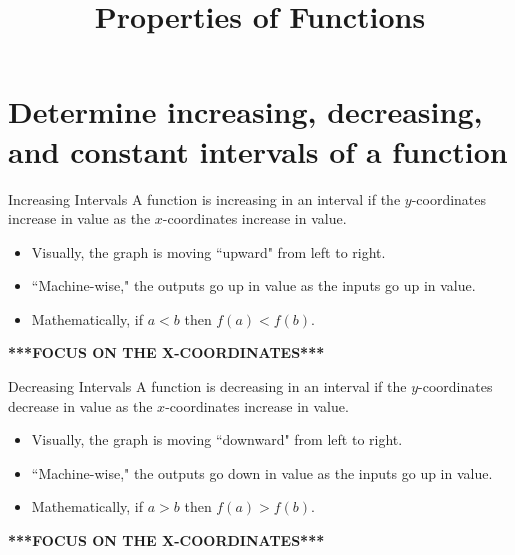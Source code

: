 \documentclass[t,usenames,dvipsnames]{beamer}
\title{Properties of Functions}
\author{}
\date{}
\begin{document}
\begin{frame}
    \titlepage
\end{frame}


\section{Determine increasing, decreasing, and constant intervals of a function}

\begin{frame}{Increasing Intervals}
A function is \alert{increasing} in an interval if the $y$-coordinates increase in value as the $x$-coordinates increase in value.    \newline\\   \pause

\begin{itemize}
    \item Visually, the graph is moving ``upward" from left to right.   \newline\\  \pause
    \item ``Machine-wise," the outputs go up in value as the inputs go up in value. \newline\\  \pause
    \item Mathematically, if $a < b$ then $f(a) < f(b)$.    \newline\\  \pause
\end{itemize}

\begin{center}
    {\color{red}\textbf{***FOCUS ON THE X-COORDINATES***}}
\end{center}
\end{frame}

\begin{frame}{Decreasing Intervals}
A function is \alert{decreasing} in an interval if the $y$-coordinates decrease in value as the $x$-coordinates increase in value.  \newline\\  \pause

\begin{itemize}
    \item Visually, the graph is moving ``downward" from left to right.   \newline\\  \pause
    \item ``Machine-wise," the outputs go down in value as the inputs go up in value. \newline\\  \pause
    \item Mathematically, if $a > b$ then $f(a) > f(b)$.    \newline\\  \pause
\end{itemize}

\begin{center}
    {\color{red}\textbf{***FOCUS ON THE X-COORDINATES***}}
\end{center}
\end{frame}
\end{document}
